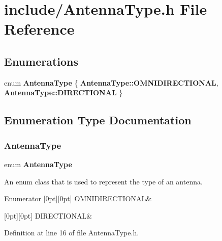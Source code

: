 \section{include/\+Antenna\+Type.h File Reference}
\label{_antenna_type_8h}
\subsection*{Enumerations}
\begin{DoxyCompactItemize}
\item 
enum \textbf{ Antenna\+Type} \{ \textbf{ Antenna\+Type\+::\+O\+M\+N\+I\+D\+I\+R\+E\+C\+T\+I\+O\+N\+AL}, 
\textbf{ Antenna\+Type\+::\+D\+I\+R\+E\+C\+T\+I\+O\+N\+AL}
 \}
\end{DoxyCompactItemize}


\subsection{Enumeration Type Documentation}
\mbox{\label{_antenna_type_8h_a7b678b5cb9dedc607131200119d96b16}} 
\subsubsection{AntennaType}
{\footnotesize\ttfamily enum \textbf{ Antenna\+Type}\hspace{0.3cm}{\ttfamily [strong]}}

An enum class that is used to represent the type of an antenna. \begin{DoxyEnumFields}{Enumerator}
[0pt][0pt]{}\mbox{\label{_antenna_type_8h_a7b678b5cb9dedc607131200119d96b16a8ff57fa72952e98025e600a041b8b8de}} 
O\+M\+N\+I\+D\+I\+R\+E\+C\+T\+I\+O\+N\+AL&\\
\hline

[0pt][0pt]{}\mbox{\label{_antenna_type_8h_a7b678b5cb9dedc607131200119d96b16ab6f2249394a4def60a78b342dcc925b9}} 
D\+I\+R\+E\+C\+T\+I\+O\+N\+AL&\\
\hline

\end{DoxyEnumFields}


Definition at line 16 of file Antenna\+Type.\+h.

